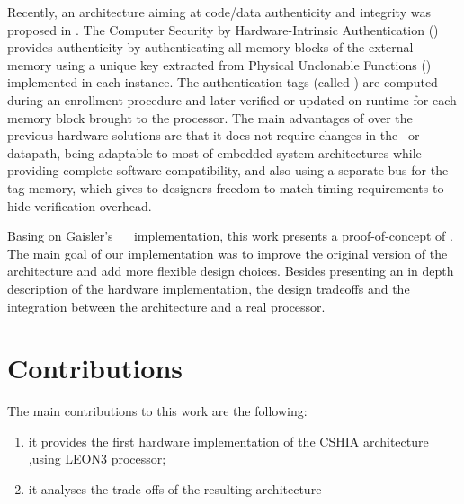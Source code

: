 Recently, an architecture aiming at code/data authenticity and integrity was proposed in \cite{Hoffman2015}. The Computer Security by Hardware-Intrinsic Authentication (\cshia) provides authenticity by authenticating all memory blocks of the external memory using a unique key extracted from Physical Unclonable Functions (\pufs) implemented in each instance. The authentication tags (called \ptags) are computed during an enrollment procedure and later verified or updated on runtime for each memory block brought to the processor. The main advantages of \cshia over the previous hardware solutions are that it does not require changes in the \isa~or datapath, being adaptable to most of embedded system architectures while providing complete software compatibility, and also using a separate bus for the tag memory, which gives to designers freedom to match timing requirements to hide verification overhead.

Basing on Gaisler's \leon~\cite{Leon} \fpga~implementation, this work presents a proof-of-concept of \cshia. The main goal of our implementation was to improve the original version of the architecture and add more flexible design choices. Besides presenting an in depth description of the hardware implementation, the design tradeoffs and the integration between the architecture and a real processor.





\section{Contributions}
\label{sec:contributions}
The main contributions to this work are the following:
\begin{enumerate}[label=(\alph*)]
    \item it provides the first hardware implementation of the CSHIA architecture ,using LEON3 processor;
    \item it analyses the trade-offs of the resulting architecture 
\end{enumerate}
